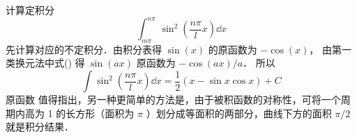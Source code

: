 \begin{exam}{计算定积分}
\begin{equation}
\int_{m\pi}^{n\pi} \sin^2(\frac{n\pi}{l} x) \dd{x}
\end{equation}
先计算对应的不定积分．由积分表得 $\sin(x)$ 的原函数为 $-\cos(x)$， 由第一类换元法中式() %
得 $\sin(ax)$ 原函数为 $-\cos(ax)/a$． 所以
\begin{equation}
\int\sin^2(\frac{n\pi}{l} x) \dd{x} = \frac{1}{2}(x - \sin x\cos x) + C
\end{equation}
原函数
值得指出，另一种更简单的方法是，由于被积函数的对称性，可将一个周期内高为 1 的长方形（面积为 $\pi$ ）划分成等面积的两部分，曲线下方的面积 $\pi /2$ 就是积分结果．%
\end{exam}
